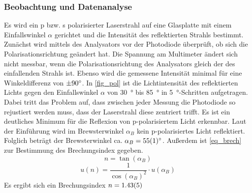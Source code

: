 \documentclass[
	a4paper,
	12pt,
	pagesize,
	ngerman
]{scrartcl}
\begin{document}
	\subsubsection{Beobachtung und Datenanalyse}
	Es wird ein p bzw. s polarisierter Laserstrahl auf eine Glasplatte mit einem Einfallswinkel $\alpha$ gerichtet und die Intensität des reflektierten Strahls bestimmt.
	Zunächst wird mittels des Analysators vor der Photodiode überprüft, ob sich die Polarisationsrichtung geändert hat. 
	Die Spannung am Multimeter ändert sich nicht messbar, wenn die Polarisationsrichtung des Analysators gleich der des einfallenden Strahls ist. 
	Ebenso wird die gemessene Intensität minimal für eine Winkeldifferenz von $\SI{\pm90}{\degree}$.
	In \cref{fig_pol} ist die Lichtintensität des reflektierten Lichts gegen den Einfallswinkel $\alpha$ von \SI{30}{\degree} bis \SI{85}{\degree} in \SI{5}{\degree}-Schritten aufgetragen.
	Dabei tritt das Problem auf, dass zwischen jeder Messung die Photodiode so rejustiert werden muss, dass der Laserstrahl diese zentriert trifft.
	Es ist ein deutliches Minimum für die Reflexion von p-polarisiertem Licht erkennbar.
	Laut der Einführung wird im Brewsterwinkel $\alpha_B$ kein p-polarisiertes Licht reflektiert.
	Folglich beträgt der Brewsterwinkel ca. $\alpha_B = \SI{55+-1}{\degree}$.
	Außerdem ist \cref{eq_brech} zur Bestimmung des Brechungsindex gegeben.
	\begin{equation}
		n= \tan(\alpha_B)
		\label{eq_brech}
	\end{equation}
	\begin{equation}
		u(n) = \frac{1}{\cos(\alpha_B)^2} \cdot u(\alpha_B)
		\label{eq_unsicher}
	\end{equation}
	Es ergibt sich ein Brechungsindex $n = \SI{1,43 +- 0,05}{}$
\end{document}
